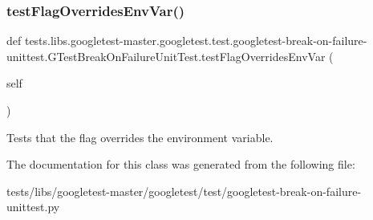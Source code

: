 \subsubsection{\texorpdfstring{test\+Flag\+Overrides\+Env\+Var()}{testFlagOverridesEnvVar()}}
{\footnotesize\ttfamily def tests.\+libs.\+googletest-\/master.\+googletest.\+test.\+googletest-\/break-\/on-\/failure-\/unittest.\+G\+Test\+Break\+On\+Failure\+Unit\+Test.\+test\+Flag\+Overrides\+Env\+Var (\begin{DoxyParamCaption}\item[{}]{self }\end{DoxyParamCaption})}

\begin{DoxyVerb}Tests that the flag overrides the environment variable.\end{DoxyVerb}
 

The documentation for this class was generated from the following file\+:\begin{DoxyCompactItemize}
\item 
tests/libs/googletest-\/master/googletest/test/googletest-\/break-\/on-\/failure-\/unittest.\+py\end{DoxyCompactItemize}
